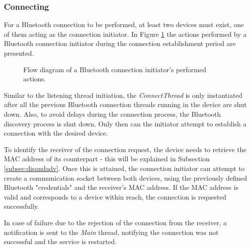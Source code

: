 \subsubsection{Connecting}
\label{subsubsec:connecting}

For a Bluetooth connection to be performed, at least two devices must exist, one of them acting as the connection initiator. In Figure \ref{fig:btrequester} the actions performed by a Bluetooth connection initiator during the connection establishment period are presented.

\begin{figure}[ht]
	\noindent{}
	\caption{\label{fig:btrequester} Flow diagram of a Bluetooth connection initiator's performed actions.}
\end{figure}



Similar to the listening thread initiation, the \textit{ConnectThread} is only instantiated after all the previous Bluetooth connection threads running in the device are shut down. Also, to avoid delays during the connection process, the Bluetooth discovery process is shut down. Only then can the initiator attempt to establish a connection with the desired device.

To identify the receiver of the connection request, the device needs to retrieve the \gls{MAC} address of its counterpart - this will be explained in Subsection \ref{subsec:disandadv}. Once this is attained, the connection initiator can attempt to create a communication socket between both devices, using the previously defined Bluetooth "credentials" and the receiver's \gls{MAC} address. If the \gls{MAC} address is valid and corresponds to a device within reach, the connection is requested successfully.

In case of failure due to the rejection of the connection from the receiver, a notification is sent to the \textit{Main} thread, notifying the connection was not successful and the service is restarted.

